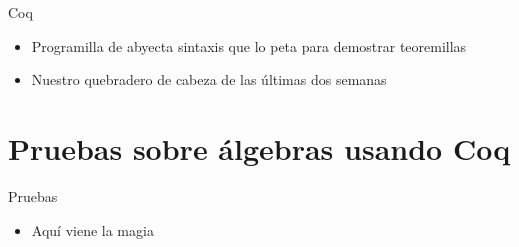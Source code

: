 \documentclass[10pt]{beamer}
\begin{document}
\begin{frame}[fragile]{Coq}

  \begin{itemize}
  \item Programilla de abyecta sintaxis que lo peta para demostrar teoremillas
  \item Nuestro quebradero de cabeza de las últimas dos semanas
  \end{itemize}

\end{frame}

\section{Pruebas sobre álgebras usando Coq}

\begin{frame}[fragile]{Pruebas}

  \begin{itemize}
  \item Aquí viene la magia
  \end{itemize}

\end{frame}
\end{document}

